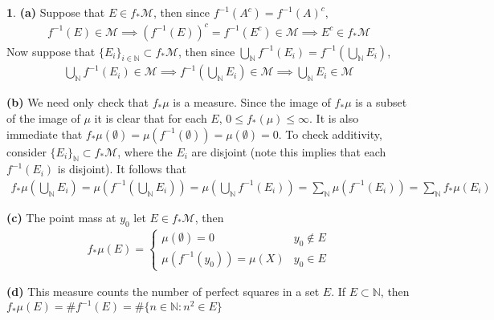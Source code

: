 \documentclass[11pt]{article}
\theoremstyle{definition}
\newtheorem{pb}{}
\newcommand{\set}[1]{\{#1\}}
\begin{document}
	\begin{pb}
		\textbf{(a)} Suppose that \(E \in f_* \mathcal{M}\), then since \(f^{-1}(A^c) = f^{-1}(A)^c\),
		\begin{align*}
			f^{-1}(E) \in \mathcal{M} \implies (f^{-1}(E))^c = f^{-1}(E^c) \in \mathcal{M} \implies E^c \in f_* \mathcal{M}
		\end{align*}
		Now suppose that \(\set{E_i}_{i \in \mathbb{N}} \subset f_* \mathcal{M}\), then since \(\bigcup_\mathbb{N} f^{-1}(E_i) = f^{-1}(\bigcup_\mathbb{N} E_i)\),
		\begin{align*}
			\bigcup_\mathbb{N} f^{-1}(E_i) \in \mathcal{M} \implies f^{-1}(\bigcup_\mathbb{N} E_i) \in \mathcal{M} \implies \bigcup_\mathbb{N} E_i \in \mathcal{M}
		\end{align*}

		\textbf{(b)} We need only check that \(f_*\mu\) is a measure. Since the image of \(f_*\mu\) is a subset of the image of \(\mu\) it is clear 
		that for each \(E\), \(0 \leq f_*(\mu) \leq \infty\). It is also immediate that \(f_*\mu(\emptyset) = \mu(f^{-1}(\emptyset)) = \mu(\emptyset) = 0\).
        To check additivity, consider \(\set{E_i}_\mathbb{N}\subset f_*\mathcal{M}\), where the \(E_i\) 
		are disjoint (note this implies that each \(f^{-1}(E_i)\) is disjoint). It follows that
		\begin{align*}
			f_*\mu(\bigcup_\mathbb{N} E_i) = \mu(f^{-1}(\bigcup_\mathbb{N} E_i)) = \mu(\bigcup_\mathbb{N} f^{-1}(E_i)) = \sum_\mathbb{N} \mu(f^{-1}(E_i)) = \sum_\mathbb{N} f_*\mu(E_i)
		\end{align*}

		\textbf{(c)} The point mass at \(y_0\) let \(E \in f_*\mathcal{M}\), then
		\begin{align*}
			f_*\mu(E) = \begin{cases}
				\mu(\emptyset) = 0 & y_0 \not \in E \\
				\mu(f^{-1}(y_0)) = \mu(X) & y_0 \in E
			\end{cases}
		\end{align*}

		\textbf{(d)} This measure counts the number of perfect squares in a set \(E\). If \(E \subset \mathbb{N}\), then
		\(f_*\mu(E) = \# f^{-1}(E) = \# \set{n \in \mathbb{N}: n^2 \in E}\)
	\end{pb}
\end{document}

